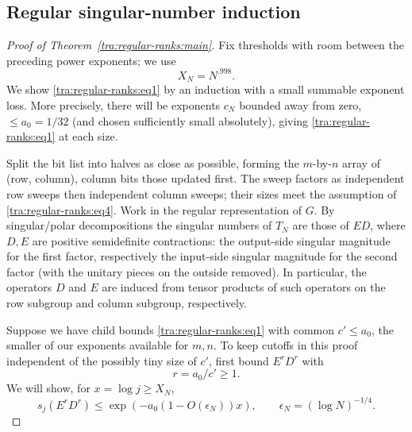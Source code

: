 \subsection{Regular singular-number induction}
\begin{proof}[Proof of Theorem~\ref{tra:regular-ranks:main}]
\label{tra:regular-ranks:regular-singular-induction}
Fix thresholds with room between the preceding power exponents; we use
\[
                        X_N=N^{.998}.
\]
We show \eqref{tra:regular-ranks:eq1} by an induction with a small summable exponent loss. More precisely, there will be exponents \(c_N\) bounded away from zero, \(\le a_0=1/32\) (and chosen sufficiently small absolutely), giving \eqref{tra:regular-ranks:eq1} at each size.

Split the bit list into halves as close as possible, forming the \(m\)-by-\(n\) array of (row, column), column bits those updated first. The sweep factors as independent row sweeps then independent column sweeps; their sizes meet the assumption of \eqref{tra:regular-ranks:eq4}. Work in the regular representation of \(G\). By singular/polar decompositions the singular numbers of \(T_N\) are those of \(E D\), where \(D,E\) are positive semidefinite contractions: the output-side singular magnitude for the first factor, respectively the input-side singular magnitude for the second factor (with the unitary pieces on the outside removed). In particular, the operators \(D\) and \(E\) are induced from tensor products of such operators on the row subgroup and column subgroup, respectively.

Suppose we have child bounds \eqref{tra:regular-ranks:eq1} with common \(c'\le a_0\), the smaller of our exponents available for \(m,n\). To keep cutoffs in this proof independent of the possibly tiny size of \(c'\), first bound \(E^r D^r\) with
\[
                                    r=a_0/c'\ge1 .
\]
We will show, for \(x=\log j\ge X_N\),
\begin{equation}
                  s_j(E^r D^r)
                       \le\exp\left(-a_0(1-O(\epsilon_N)) x\right),
                    \qquad \epsilon_N=(\log N)^{-1/4}.\label{tra:regular-ranks:eq11}
\end{equation}


\end{proof}
